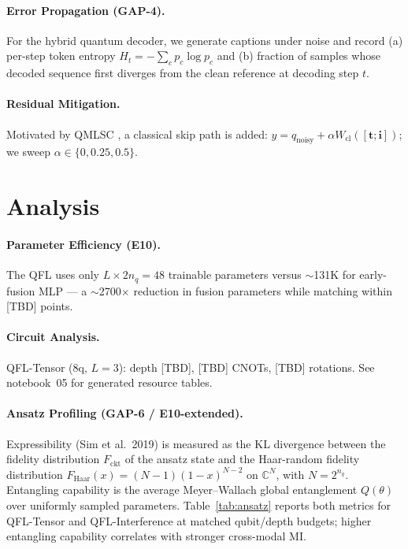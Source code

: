 \documentclass[11pt]{article}
\begin{document}
\paragraph{Error Propagation (GAP-4).}
For the hybrid quantum decoder, we generate captions under noise and record
(a) per-step token entropy $H_t = -\sum_c p_c \log p_c$ and (b)
fraction of samples whose decoded sequence first diverges from the clean
reference at decoding step $t$.

\paragraph{Residual Mitigation.}
Motivated by QMLSC \citep{li2025qmlsc}, a classical skip path is added:
$y = q_{\text{noisy}} + \alpha W_{\text{cl}}([\mathbf{t};\mathbf{i}])$;
we sweep $\alpha \in \{0, 0.25, 0.5\}$.

\section{Analysis}
\label{sec:analysis}

\paragraph{Parameter Efficiency (E10).}
The QFL uses only $L \times 2 n_q = 48$ trainable parameters versus
$\sim$131K for early-fusion MLP --- a $\sim$2700$\times$ reduction in fusion
parameters while matching within [TBD] points.

\paragraph{Circuit Analysis.}
QFL-Tensor (8q, $L{=}3$): depth [TBD], [TBD] CNOTs, [TBD] rotations.
See notebook~05 for generated resource tables.

\paragraph{Ansatz Profiling (GAP-6 / E10-extended).}
Expressibility (Sim et al.\ 2019) is measured as the KL divergence between
the fidelity distribution $F_{\text{ckt}}$ of the ansatz state and the
Haar-random fidelity distribution
$F_{\text{Haar}}(x) = (N-1)(1-x)^{N-2}$ on $\mathbb{C}^N$, with
$N = 2^{n_q}$. Entangling capability is the average Meyer--Wallach
global entanglement $Q(\theta)$ over uniformly sampled parameters.
Table~\ref{tab:ansatz} reports both metrics for QFL-Tensor and
QFL-Interference at matched qubit/depth budgets; higher entangling
capability correlates with stronger cross-modal MI.
\end{document}
